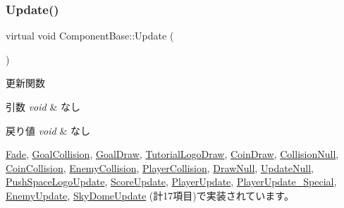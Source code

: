 \mbox{\label{class_component_base_a58e66d65bc8f3cd5ab67b4b2deab4fc2}} 
\subsubsection{\texorpdfstring{Update()}{Update()}}
{\footnotesize\ttfamily virtual void Component\+Base\+::\+Update (\begin{DoxyParamCaption}{ }\end{DoxyParamCaption})\hspace{0.3cm}{\ttfamily [pure virtual]}}



更新関数 


\begin{DoxyParams}{引数}
{\em void} & なし \\
\hline
\end{DoxyParams}

\begin{DoxyRetVals}{戻り値}
{\em void} & なし \\
\hline
\end{DoxyRetVals}


\mbox{\hyperlink{class_fade_a1579b5b9020344a1131ea11c15f2c0bd}{Fade}}, \mbox{\hyperlink{class_goal_collision_a1e3995dc2f5ba2678580d06699ca6936}{Goal\+Collision}}, \mbox{\hyperlink{class_goal_draw_a6e003277ed44eb9c800a616b6acbcb20}{Goal\+Draw}}, \mbox{\hyperlink{class_tutorial_logo_draw_af69405fcc8b20684a19e982726d93ffa}{Tutorial\+Logo\+Draw}}, \mbox{\hyperlink{class_coin_draw_a6157b17bf1706b85156aad0d88acfd7e}{Coin\+Draw}}, \mbox{\hyperlink{class_collision_null_a5e5e094e3fbe3ccc0515e485c739bd15}{Collision\+Null}}, \mbox{\hyperlink{class_coin_collision_a981fd9b1b8c688a757a456a56d80501b}{Coin\+Collision}}, \mbox{\hyperlink{class_enemy_collision_ab54133504d867c6d2070d2f3854a0aaf}{Enemy\+Collision}}, \mbox{\hyperlink{class_player_collision_a09f97f220903f5724a3af6b97af3a336}{Player\+Collision}}, \mbox{\hyperlink{class_draw_null_a0149bcf84a34b138642ab7975ae46f30}{Draw\+Null}}, \mbox{\hyperlink{class_update_null_a692f4f34e4ef35ca286a1d3606fdf473}{Update\+Null}}, \mbox{\hyperlink{class_push_space_logo_update_aa07fe6f6f4f072e1f81bc6708dd4727e}{Push\+Space\+Logo\+Update}}, \mbox{\hyperlink{class_score_update_aae2b398784079a651ed92eb4c634b1c9}{Score\+Update}}, \mbox{\hyperlink{class_player_update_af6e1b8ca60399f232e64d2acb4968c75}{Player\+Update}}, \mbox{\hyperlink{class_player_update___special_afef3503e292dbaded809068fd87deadd}{Player\+Update\+\_\+\+Special}}, \mbox{\hyperlink{class_enemy_update_ae9662f3a2d064dc69c0d68293e60f051}{Enemy\+Update}}, \mbox{\hyperlink{class_sky_dome_update_ae163cb90e4de561fe1f7b2cb311be331}{Sky\+Dome\+Update}} (計17項目)で実装されています。



